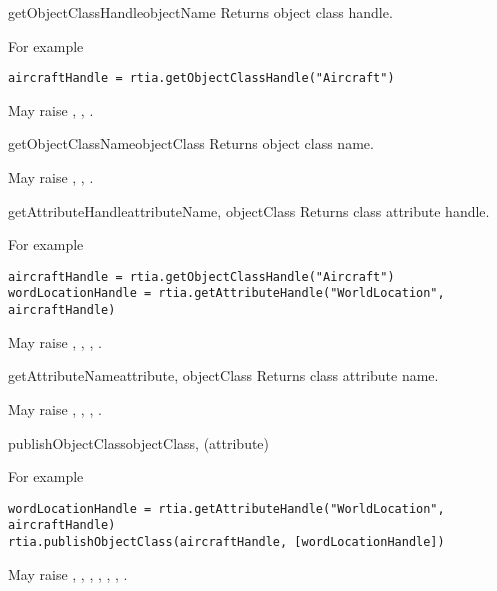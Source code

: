 \begin{methoddesc}{getObjectClassHandle}{objectName}
Returns object class handle.

For example
\begin{verbatim}
aircraftHandle = rtia.getObjectClassHandle("Aircraft")
\end{verbatim}

May raise
,
,
.
\end{methoddesc}

\begin{methoddesc}{getObjectClassName}{objectClass}
Returns object class name.

May raise
,
,
.
\end{methoddesc}

\begin{methoddesc}{getAttributeHandle}{attributeName, objectClass}
Returns class attribute handle.

For example
\begin{verbatim}
aircraftHandle = rtia.getObjectClassHandle("Aircraft")
wordLocationHandle = rtia.getAttributeHandle("WorldLocation", aircraftHandle)
\end{verbatim}

May raise
,
,
,
.
\end{methoddesc}

\begin{methoddesc}{getAttributeName}{attribute, objectClass}
Returns class attribute name.

May raise
,
,
,
.
\end{methoddesc}

\begin{methoddesc}{publishObjectClass}{objectClass, (attribute)}

For example
\begin{verbatim}
wordLocationHandle = rtia.getAttributeHandle("WorldLocation", aircraftHandle)
rtia.publishObjectClass(aircraftHandle, [wordLocationHandle])
\end{verbatim}

May raise
,
,
,
,
,
,
.
\end{methoddesc}

